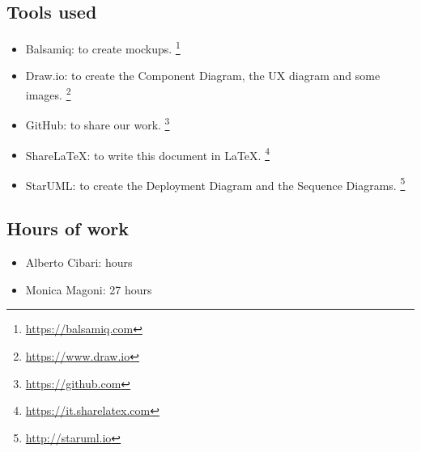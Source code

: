 \subsection*{Tools used}
    \begin{itemize}
    \item Balsamiq: to create mockups. \footnote{\url{https://balsamiq.com}}
     \item Draw.io: to create the Component Diagram, the UX diagram and some images.
    \footnote{\url{https://www.draw.io}}
     \item GitHub: to share our work. 
    \footnote{\url{https://github.com}} 
    \item ShareLaTeX: to write this document in LaTeX. \footnote{\url{https://it.sharelatex.com}}
    \item StarUML: to create the Deployment Diagram and the Sequence Diagrams. \footnote{\url{http://staruml.io}}
    \end{itemize}

\subsection*{Hours of work}
    \begin{itemize}
    \item Alberto Cibari:  hours
    \item Monica Magoni: 27 hours
    \end{itemize}
